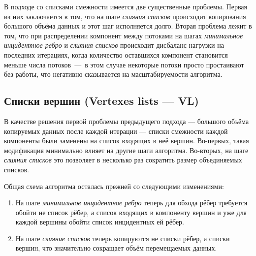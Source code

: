 \documentclass[a4paper,10pt]{extarticle}
\begin{document}
В  подходе со списками смежности имеется две существенные проблемы. 
Первая из них заключается в том, что на шаге \textit{слияния списков} происходит копирования большого объёма данных и этот шаг исполняется долго.
Вторая проблема лежит в том, что при распределении компонент между потоками на шагах \textit{минимальное инцидентное ребро} и \textit{слияния списков} происходит дисбаланс нагрузки на последних итерациях, когда количество оставшихся компонент становится меньше числа потоков~---~в этом случае некоторые потоки просто простаивают без работы, что негативно сказывается на масштабируемости алгоритма.


\subsection{Списки вершин (Vertexes lists --- VL)}


В качестве решения первой проблемы предыдущего подхода --- большого объёма копируемых данных после каждой итерации --- списки смежности каждой компоненты были заменены на список входящих в неё вершин. Во-первых, такая модификация минимально влияет на другие шаги алгоритма. Во-вторых, на шаге \textit{слияния списков} это позволяет в несколько раз сократить размер объединяемых списков.

Общая схема алгоритма осталась прежней со следующими изменениями:
\begin{enumerate}
    \item На шаге \textit{минимальное инцидентное ребро} теперь для обхода рёбер требуется обойти не список рёбер, а список входящих в компоненту вершин и уже для каждой вершины обойти список инцидентных ей рёбер.
    \item На шаге \textit{слияние списков} теперь копируются не списки рёбер, а списки вершин, что значительно сокращает объём перемещаемых данных.
\end{enumerate}
\end{document}
